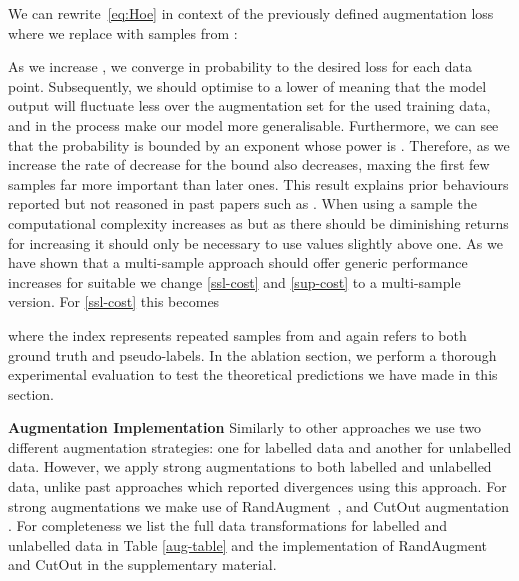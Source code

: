 \documentclass[journal]{IEEEtran}
\begin{document}
We can rewrite~\eqref{eq:Hoe} in context of the previously defined augmentation loss where we replace  with  samples from  : 





As we increase , we converge in probability to the desired loss  for each data point. Subsequently, we should optimise to a lower of  meaning that the model output will fluctuate less over the augmentation set  for the used training data, and in the process make our model more generalisable. Furthermore, we can see that the probability is bounded by an exponent whose power is  . Therefore, as we increase  the rate of decrease for the bound also decreases, maxing the first few samples far more important than later ones. This result explains prior behaviours reported but not reasoned in past papers such as \cite{remixmatch}. When using a  sample the computational complexity increases as  but as there should be diminishing returns for increasing  it should only be necessary to use  values slightly above one. As we have shown that a multi-sample approach should offer generic performance increases for suitable  we change \eqref{ssl-cost} and \eqref{sup-cost} to a multi-sample version. For \eqref{ssl-cost} this becomes 



\noindent where the index  represents repeated samples from  and again  refers to both ground truth and pseudo-labels.  In the ablation section, we perform a thorough experimental evaluation to test the theoretical predictions we have made in this section. 

\textbf{Augmentation Implementation} Similarly to other approaches we use two different augmentation strategies: one for labelled data and another for unlabelled data. However, we apply strong augmentations to both labelled and unlabelled data,  unlike past approaches \cite{sohn2020fixmatch} which reported divergences using this approach. For strong augmentations we make use of RandAugment~\cite{cubuk2020randaugment}, and CutOut augmentation \cite{devries2017improved}.  For completeness we list the full data transformations for labelled and unlabelled data in Table \ref{aug-table} and the implementation of RandAugment and CutOut in the supplementary material.
\end{document}
